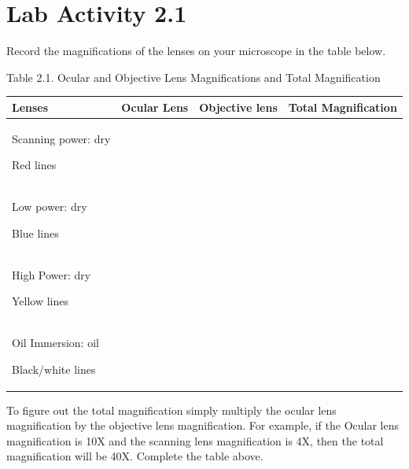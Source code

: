 \documentclass[
  letterpaper,
  DIV=11,
  numbers=noendperiod]{scrreprt}
\newcounter{none} %
\begin{document}
\section{\texorpdfstring{\textbf{Lab Activity
2.1}}{Lab Activity 2.1}}\label{lab-activity-2.1-1}

Record the magnifications of the lenses on your microscope in the table
below.

Table 2.1. Ocular and Objective Lens Magnifications and Total
Magnification

{\def\LTcaptype{none} %
\begin{longtable}[]{@{}
  >{\raggedright\arraybackslash}p{}
  >{\raggedright\arraybackslash}p{}
  >{\raggedright\arraybackslash}p{}
  >{\raggedright\arraybackslash}p{}@{}}
\toprule\noalign{}
\begin{minipage}[b]{\linewidth}\raggedright
\textbf{Lenses}
\end{minipage} & \begin{minipage}[b]{\linewidth}\raggedright
\textbf{Ocular Lens}
\end{minipage} & \begin{minipage}[b]{\linewidth}\raggedright
\textbf{Objective lens}
\end{minipage} & \begin{minipage}[b]{\linewidth}\raggedright
\textbf{Total Magnification}
\end{minipage} \\
\midrule\noalign{}
\endhead
\bottomrule\noalign{}
\endlastfoot
Scanning power: dry

Red lines & & & \\
Low power: dry

Blue lines & & & \\
High Power: dry

Yellow lines & & & \\
Oil Immersion: oil

Black/white lines & & & \\
\end{longtable}
}

To figure out the total magnification simply multiply the ocular lens
magnification by the objective lens magnification. For example, if the
Ocular lens magnification is 10X and the scanning lens magnification is
4X, then the total magnification will be 40X. Complete the table above.
\end{document}
